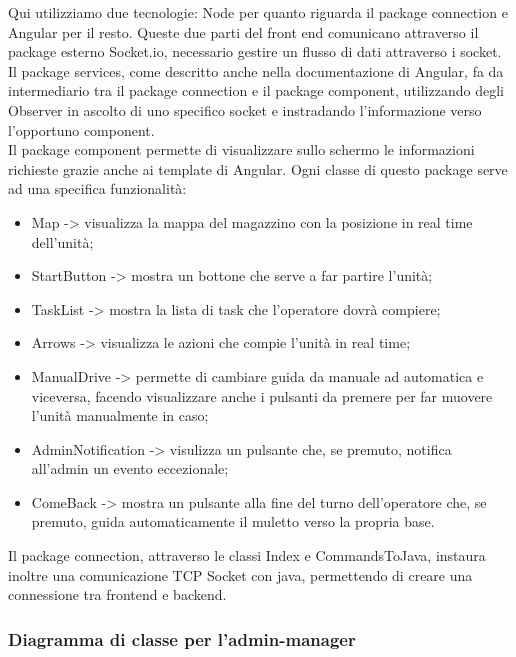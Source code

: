 Qui utilizziamo due tecnologie: Node per quanto riguarda il package connection e Angular per il resto. Queste due parti del front end comunicano attraverso il package esterno Socket.io, necessario gestire un flusso di dati attraverso i socket.\\
Il package services, come descritto anche nella documentazione di Angular, fa da intermediario tra il package connection e il package component, utilizzando degli Observer in ascolto di uno specifico socket e instradando l'informazione verso l'opportuno component.\\
Il package component permette di visualizzare sullo schermo le informazioni richieste grazie anche ai template di Angular. Ogni classe di questo package serve ad una specifica funzionalità:
\begin{itemize}
	\item Map -> visualizza la mappa del magazzino con la posizione in real time dell'unità;
	\item StartButton -> mostra un bottone che serve a far partire l'unità;
	\item TaskList -> mostra la lista di task che l'operatore dovrà compiere;
	\item Arrows -> visualizza le azioni che compie l'unità in real time;
	\item ManualDrive -> permette di cambiare guida da manuale ad automatica e viceversa, facendo visualizzare anche i pulsanti da premere per far muovere l'unità manualmente in caso;
	\item AdminNotification -> visulizza un pulsante che, se premuto, notifica all'admin un evento eccezionale;
	\item ComeBack -> mostra un pulsante alla fine del turno dell'operatore che, se premuto, guida automaticamente il muletto verso la propria base. 
\end{itemize} 
Il package connection, attraverso le classi Index e CommandsToJava, instaura inoltre una comunicazione TCP Socket con java, permettendo di creare una connessione tra frontend e backend.\\

\subsubsection{Diagramma di classe per l'admin-manager}


